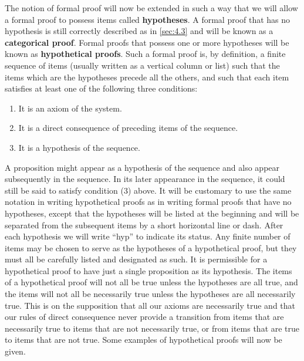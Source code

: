 \documentclass{book}
\let\oldmarginpar\marginpar
\renewcommand*{\marginpar}[1]{\oldmarginpar{\footnotesize#1}}
\begin{document}
The notion of formal proof will now be extended in such a way that we will allow a formal proof to possess items called \textbf{hypotheses}.  A formal proof that has no hypothesis is still correctly described as in \ref{sec:4.3} and will be known as a \textbf{categorical proof}.  Formal proofs that possess one or more hypotheses will be known as \textbf{hypothetical proofs}.  Such a formal proof is, by definition, a finite sequence of items (usually written as a vertical column or list) such that the items which are the hypotheses precede all the others, and such that each item satisfies at least one of the following three conditions:
\begin{enumerate}[resume*,start=1]
\item It is an axiom of the system.
\item It is a direct consequence of preceding items of the sequence.
\item It is a hypothesis of the sequence.
\end{enumerate}
A proposition might appear as a hypothesis of the sequence and also appear subsequently in the sequence.  In its later appearance in the sequence, it could still be said to satisfy condition (3) above.  It will be customary to use the same notation in writing hypothetical proofs as in writing formal proofs that have no hypotheses, except that the hypotheses will be listed at the beginning and will be separated from the subsequent items by a short horizontal line or dash.  After each \marginpar{\hfill 15}hypothesis we will write “hyp” to indicate its status.  Any finite number of items may be chosen to serve as the hypotheses of a hypothetical proof, but they must all be carefully listed and designated as such.  It is permissible for a hypothetical proof to have just a single proposition as its hypothesis.  The items of a hypothetical proof will not all be true unless the hypotheses are all true, and the items will not all be necessarily true unless the hypotheses are all necessarily true.  This is on the supposition that all our axioms are necessarily true and that our rules of direct consequence never provide a transition from items that are necessarily true to items that are not necessarily true, or from items that are true to items that are not true.  Some examples of hypothetical proofs will now be given.

\medskip
\subsection{}
\label{sec:4.9}
\end{document}

